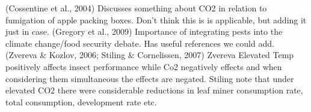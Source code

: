 \documentclass[12pt]{article}
\theoremstyle{plain}
\theoremstyle{definition}
\theoremstyle{definition}
\begin{document}
(Cossentine et al., 2004) Discusses something 
about CO2 in relation to fumigation of apple 
packing boxes. Don’t think this is  is applicable, 
but adding it just in case.
(Gregory et al., 2009) Importance of integrating 
pests into the climate change/food security 
debate. Has useful references we could add.
(Zvereva \& Kozlov, 2006; Stiling \& Cornelissen, 2007)  
Zvereva Elevated Temp positively affects 
insect performance while Co2 negatively 
effects and when considering them 
simultaneous the effects are negated. 
Stiling note that under elevated CO2 
there were considerable reductions in 
leaf miner consumption rate, total 
consumption, development rate etc.




\end{document}
